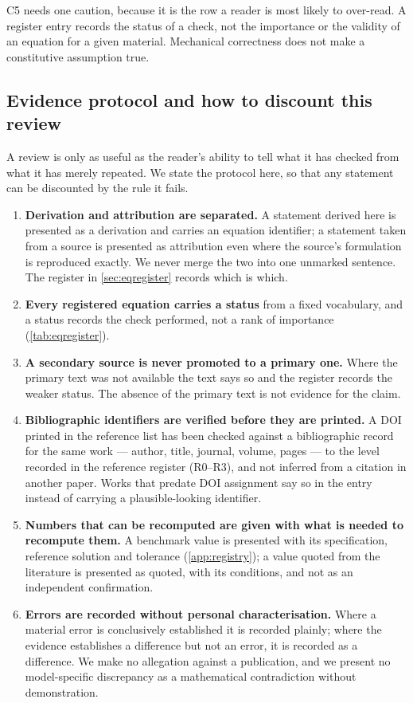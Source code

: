 C5 needs one caution, because it is the row a reader is most likely to over-read. A register entry records the status of a check, not the importance or the validity of an equation for a given material. Mechanical correctness does not make a constitutive assumption true.

\subsection{Evidence protocol and how to discount this review}\label{sec:evidence_protocol}

A review is only as useful as the reader's ability to tell what it has checked from what it has merely
repeated. We state the protocol here, so that any statement can be discounted by the rule it fails.

\begin{enumerate}
\item \textbf{Derivation and attribution are separated.} A statement derived here is presented as a
derivation and carries an equation identifier; a statement taken from a source is presented as
attribution even where the source's formulation is reproduced exactly. We never merge the two into one
unmarked sentence. The register in \cref{sec:eqregister} records which is which.
\item \textbf{Every registered equation carries a status} from a fixed vocabulary, and a status records
the check performed, not a rank of importance (\cref{tab:eqregister}).
\item \textbf{A secondary source is never promoted to a primary one.} Where the primary text was not
available the text says so and the register records the weaker status. The absence of the primary text
is not evidence for the claim.
\item \textbf{Bibliographic identifiers are verified before they are printed.} A DOI printed in the
reference list has been checked against a bibliographic record for the same work --- author,
title, journal, volume, pages --- to the level recorded in the reference register (R0--R3), and not
inferred from a citation in another paper. Works that predate DOI assignment say so in the entry instead of carrying a plausible-looking identifier.
\item \textbf{Numbers that can be recomputed are given with what is needed to recompute them.} A benchmark
value is presented with its specification, reference solution and tolerance
(\cref{app:registry}); a value quoted from the literature is presented as quoted, with its conditions,
and not as an independent confirmation.
\item \textbf{Errors are recorded without personal characterisation.} Where a material error is
conclusively established it is recorded plainly; where the evidence establishes a difference but not an
error, it is recorded as a difference. We make no allegation against a publication, and we present no model-specific
discrepancy as a mathematical contradiction without demonstration.
\end{enumerate}

